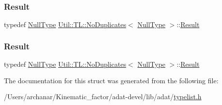 \mbox{\label{structUtil_1_1TL_1_1NoDuplicates_3_01NullType_01_4_abb8d5323219cad8bdeef505d43773254}} 
\subsubsection{\texorpdfstring{Result}{Result}\hspace{0.1cm}{\footnotesize\ttfamily [2/3]}}
{\footnotesize\ttfamily typedef \mbox{\hyperlink{classUtil_1_1NullType}{Null\+Type}} \mbox{\hyperlink{structUtil_1_1TL_1_1NoDuplicates}{Util\+::\+T\+L\+::\+No\+Duplicates}}$<$ \mbox{\hyperlink{classUtil_1_1NullType}{Null\+Type}} $>$\+::\mbox{\hyperlink{structUtil_1_1TL_1_1NoDuplicates_3_01NullType_01_4_abb8d5323219cad8bdeef505d43773254}{Result}}}

\mbox{\label{structUtil_1_1TL_1_1NoDuplicates_3_01NullType_01_4_abb8d5323219cad8bdeef505d43773254}} 
\subsubsection{\texorpdfstring{Result}{Result}\hspace{0.1cm}{\footnotesize\ttfamily [3/3]}}
{\footnotesize\ttfamily typedef \mbox{\hyperlink{classUtil_1_1NullType}{Null\+Type}} \mbox{\hyperlink{structUtil_1_1TL_1_1NoDuplicates}{Util\+::\+T\+L\+::\+No\+Duplicates}}$<$ \mbox{\hyperlink{classUtil_1_1NullType}{Null\+Type}} $>$\+::\mbox{\hyperlink{structUtil_1_1TL_1_1NoDuplicates_3_01NullType_01_4_abb8d5323219cad8bdeef505d43773254}{Result}}}



The documentation for this struct was generated from the following file\+:\begin{DoxyCompactItemize}
\item 
/\+Users/archanar/\+Kinematic\+\_\+factor/adat-\/devel/lib/adat/\mbox{\hyperlink{adat-devel_2lib_2adat_2typelist_8h}{typelist.\+h}}\end{DoxyCompactItemize}
